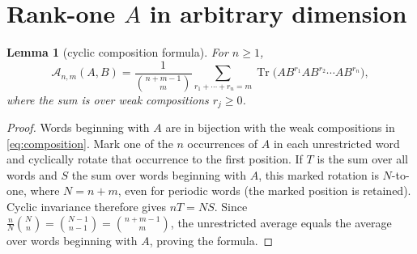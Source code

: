 \documentclass[11pt]{article}
\newtheorem{lemma}[theorem]{Lemma}
\newcommand{\Tr}{\operatorname{Tr}}
\newcommand{\Aav}{\mathcal A}
\begin{document}
\section{Rank-one \(A\) in arbitrary dimension}
\begin{lemma}[cyclic composition formula]\label{lem:composition}
For \(n\geq1\),
\begin{equation}\label{eq:composition}
 \Aav_{n,m}(A,B)
 =\frac{1}{\binom{n+m-1}{m}}
 \sum_{r_1+\cdots+r_n=m}
 \Tr\bigl(AB^{r_1}AB^{r_2}\cdots AB^{r_n}\bigr),
\end{equation}
where the sum is over weak compositions \(r_j\geq0\).
\end{lemma}
\begin{proof}
Words beginning with \(A\) are in bijection with the weak compositions in
\eqref{eq:composition}. Mark one of the \(n\) occurrences of \(A\) in each
unrestricted word and cyclically rotate that occurrence to the first
position. If \(T\) is the sum over all words and \(S\) the sum over words
beginning with \(A\), this marked rotation is \(N\)-to-one, where
\(N=n+m\), even for periodic words (the marked position is retained).
Cyclic invariance therefore gives \(nT=NS\). Since
\(\frac nN\binom Nn=\binom{N-1}{n-1}=\binom{n+m-1}{m}\), the unrestricted
average equals the average over words beginning with \(A\), proving the
formula.
\end{proof}
\end{document}
